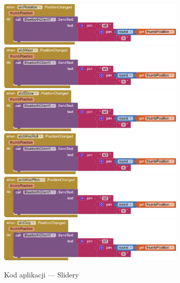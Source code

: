 \documentclass[11pt,titlepage]{article}
\begin{document}
\begin{figure}[p]
    \begin{center}
        \includegraphics[width=0.8\textwidth]{img/app_src/sliders/slidRotation.png}
        \includegraphics[width=0.8\textwidth]{img/app_src/sliders/slidWaist.png}
        \includegraphics[width=0.8\textwidth]{img/app_src/sliders/slidElbow.png}
        \includegraphics[width=0.8\textwidth]{img/app_src/sliders/slidWristRoll.png}
        \includegraphics[width=0.8\textwidth]{img/app_src/sliders/slidWristPitch.png}
        \includegraphics[width=0.8\textwidth]{img/app_src/sliders/slidGrip.png}
    \end{center}
    \caption{Kod aplikacji — Slidery}
    \label{AppSlidery}
\end{figure}
\end{document}
